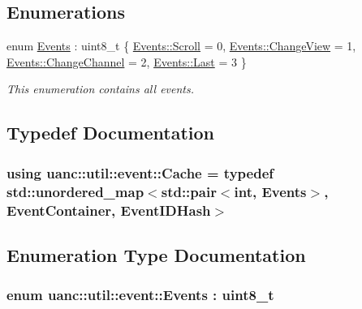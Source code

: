 \subsection*{Enumerations}
\begin{DoxyCompactItemize}
\item 
enum \hyperlink{namespaceuanc_1_1util_1_1event_a63f690675589114db9c6bcbe6f1088a4}{Events} \+: uint8\+\_\+t \{ \hyperlink{namespaceuanc_1_1util_1_1event_a63f690675589114db9c6bcbe6f1088a4a105078d294d30c978ca2badf7f376934}{Events\+::\+Scroll} = 0, 
\hyperlink{namespaceuanc_1_1util_1_1event_a63f690675589114db9c6bcbe6f1088a4adfe36a0ed1bbdd0235930d52d3cf983a}{Events\+::\+Change\+View} = 1, 
\hyperlink{namespaceuanc_1_1util_1_1event_a63f690675589114db9c6bcbe6f1088a4a1f35708d483b7a33e32dddb834e11980}{Events\+::\+Change\+Channel} = 2, 
\hyperlink{namespaceuanc_1_1util_1_1event_a63f690675589114db9c6bcbe6f1088a4ad55b30607c2a9a2616347d6edb789f6b}{Events\+::\+Last} = 3
 \}\begin{DoxyCompactList}\small\item\em This enumeration contains all events. \end{DoxyCompactList}
\end{DoxyCompactItemize}


\subsection{Typedef Documentation}
\subsubsection[{\texorpdfstring{Cache}{Cache}}]{\setlength{\rightskip}{0pt plus 5cm}using {\bf uanc\+::util\+::event\+::\+Cache} = typedef std\+::unordered\+\_\+map$<$std\+::pair$<$int, {\bf Events}$>$, {\bf Event\+Container}, {\bf Event\+I\+D\+Hash}$>$}\hypertarget{namespaceuanc_1_1util_1_1event_a6c68db6cd59c1f00cb2103bb9ee263a1}{}\label{namespaceuanc_1_1util_1_1event_a6c68db6cd59c1f00cb2103bb9ee263a1}


\subsection{Enumeration Type Documentation}
\subsubsection[{\texorpdfstring{Events}{Events}}]{\setlength{\rightskip}{0pt plus 5cm}enum {\bf uanc\+::util\+::event\+::\+Events} \+: uint8\+\_\+t\hspace{0.3cm}{\ttfamily [strong]}}\hypertarget{namespaceuanc_1_1util_1_1event_a63f690675589114db9c6bcbe6f1088a4}{}\label{namespaceuanc_1_1util_1_1event_a63f690675589114db9c6bcbe6f1088a4}


